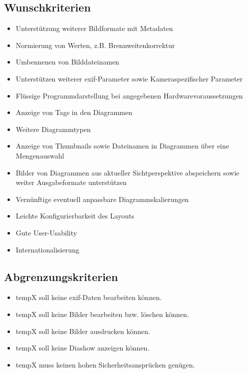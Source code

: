 \subsection{Wunschkriterien} 
\begin{itemize}
  	\item Unterstützung weiterer Bildformate mit Metadaten
	\item Normierung von Werten, z.B. Brennweitenkorrektur
	\item Umbennenen von Bilddateinamen
	\item Unterstützen weiterer \gls{exif}-Parameter sowie Kameraspezifischer Parameter
	\item Flüssige Programmdarstellung bei angegebenen Hardwarevoraussetzungen
	\item Anzeige von Tags in den Diagrammen
	\item Weitere Diagrammtypen
	\item Anzeige von Thumbnails sowie Dateinamen in Diagrammen über eine Mengenauswahl
	\item Bilder von Diagrammen aus aktueller Sichtperspektive abspeichern sowie weiter Ausgabeformate unterstützen 
	\item Vernünftige eventuell anpassbare Diagrammskalierungen
	\item Leichte Konfigurierbarkeit des Layouts
	\item Gute User-Usability
	\item Internationalisierung
\end{itemize}

\subsection{Abgrenzungskriterien} 
\begin{itemize}
	\item \gls{tempX} soll keine \gls{exif}-Daten bearbeiten können.
	\item \gls{tempX} soll keine Bilder bearbeiten bzw. löschen können.
	\item \gls{tempX} soll keine Bilder ausdrucken können.
	\item \gls{tempX} soll keine Diashow anzeigen können.
	\item \gls{tempX} muss keinen hohen Sicherheitsansprüchen genügen.
\end{itemize}
